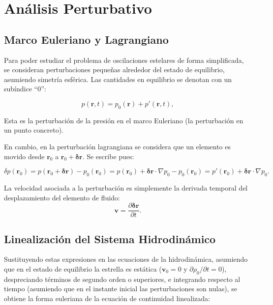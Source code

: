 \section{Análisis Perturbativo}

\subsection{Marco Euleriano y Lagrangiano}

Para poder estudiar el problema de oscilaciones estelares de forma simplificada, se consideran perturbaciones pequeñas alrededor del estado de equilibrio, asumiendo simetría esférica. Las cantidades en equilibrio se denotan con un subíndice ``$0$'':

\begin{equation}
  p(\mathbf{r}, t) = p_0(\mathbf{r}) + p'(\mathbf{r}, t),
\end{equation}

Esta es la perturbación de la presión en el marco Euleriano (la perturbación en un punto concreto).

En cambio, en la perturbación lagrangiana se considera que un elemento es movido desde $\mathbf{r}_0$ a $\mathbf{r}_0 + \boldsymbol{\delta r}$. Se escribe pues:

\begin{equation*}
  \delta p(\mathbf{r}_0) = p(\mathbf{r}_0 + \boldsymbol{\delta r}) - p_0(\mathbf{r}_0) = p (\mathbf{r}_0) + \boldsymbol{\delta r} \cdot \nabla p_0 - p_0(\mathbf{r}_0) = p'(\mathbf{r}_0) + \boldsymbol{\delta r} \cdot \nabla p_0.
\end{equation*}

La velocidad asociada a la perturbación es simplemente la derivada temporal del desplazamiento del elemento de fluido:
\begin{equation}
  \mathbf{v} = \frac{\partial \boldsymbol{\delta r}}{\partial t}.
\end{equation}

\subsection{Linealización del Sistema Hidrodinámico}

Sustituyendo estas expresiones en las ecuaciones de la hidrodinámica, asumiendo que en el estado de equilibrio la estrella es estática ($\mathbf{v}_0 = 0$ y $\partial \rho_0 / \partial t = 0$), despreciando términos de segundo orden o superiores, e integrando respecto al tiempo (asumiendo que en el instante inicial las perturbaciones son nulas), se obtiene la forma euleriana de la ecuación de continuidad linealizada:

